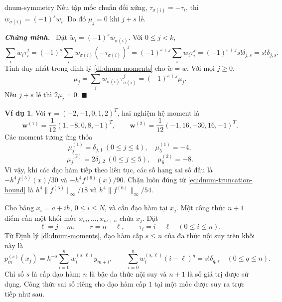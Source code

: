 \documentclass[12pt,a4paper,oneside]{book}
\numberwithin{algorithm}{chapter}
\theoremstyle{definition}
\newtheorem{vidu}{Ví dụ}[chapter]
\newenvironment{chungminh}{\par\medskip\noindent\textbf{\textit{\color{mainblue}Chứng minh.}}\ }{\hfill$\blacksquare$\par\medskip}
\begin{document}
\begin{menhde}{}{dnum-symmetry}
Nếu tập mốc chuẩn đối xứng, $\tau_{\sigma(i)}=-\tau_i$, thì $w_{\sigma(i)}=(-1)^s w_i$. Do đó $\mu_j=0$ khi $j+s$ lẻ.
\end{menhde}
\begin{chungminh}
Đặt $\widetilde w_i=(-1)^sw_{\sigma(i)}$. Với $0\leq j<k$,
\[
 \sum_i\widetilde w_i\tau_i^j=(-1)^s\sum_iw_{\sigma(i)}(-\tau_{\sigma(i)})^j
 =(-1)^{s+j}\sum_iw_i\tau_i^j
 =(-1)^{s+j}s!\delta_{j,s}=s!\delta_{j,s}.
\]
Tính duy nhất trong định lý \ref{dl:dnum-moments} cho $\widetilde w=w$. Với mọi $j\geq0$,
\[
 \mu_j=\sum_iw_{\sigma(i)}\tau_{\sigma(i)}^j=(-1)^{s+j}\mu_j.
\]
Nếu $j+s$ lẻ thì $2\mu_j=0$.
\end{chungminh}

\begin{vidu}
Với $\boldsymbol\tau=(-2,-1,0,1,2)^T$, hai nghiệm hệ moment là
\[
 \boldsymbol w^{(1)}=\frac1{12}(1,-8,0,8,-1)^T,
 \qquad \boldsymbol w^{(2)}=\frac1{12}(-1,16,-30,16,-1)^T.
\]
Các moment tương ứng thỏa
\[
 \mu^{(1)}_j=\delta_{j,1}\ (0\leq j\leq4),\quad\mu^{(1)}_5=-4,
\]
\[
 \mu^{(2)}_j=2\delta_{j,2}\ (0\leq j\leq5),\quad\mu^{(2)}_6=-8.
\]
Vì vậy, khi các đạo hàm tiếp theo liên tục, các số hạng sai số đầu là $-h^4f^{(5)}(x)/30$ và $-h^4f^{(6)}(x)/90$. Chặn luôn đúng từ \eqref{eq:dnum-truncation-bound} là $h^4\lVert f^{(5)}\rVert_\infty/18$ và $h^4\lVert f^{(6)}\rVert_\infty/54$.
\end{vidu}

Cho bảng $x_i=a+ih$, $0\leq i\leq N$, và cần đạo hàm tại $x_j$. Một công thức $n+1$ điểm cần một khối mốc $x_m,\ldots,x_{m+n}$ chứa $x_j$. Đặt
\[
 \ell=j-m,\qquad r=n-\ell,\qquad
 \tau_i=i-\ell\quad(0\leq i\leq n).
\]
Từ Định lý \ref{dl:dnum-moments}, đạo hàm cấp $s\leq n$ của đa thức nội suy trên khối này là
\begin{equation}\label{eq:dnum-block-derivative}
 p_m^{(s)}(x_j)=h^{-s}\sum_{i=0}^n w_i^{(s,\ell)}y_{m+i},\qquad
 \sum_{i=0}^nw_i^{(s,\ell)}(i-\ell)^q=s!\delta_{q,s}\quad(0\leq q\leq n).
\end{equation}
Chỉ số $s$ là cấp đạo hàm; $n$ là bậc đa thức nội suy và $n+1$ là số giá trị được sử dụng. Công thức sai số riêng cho đạo hàm cấp $1$ tại một mốc được suy ra trực tiếp như sau.
\end{document}
